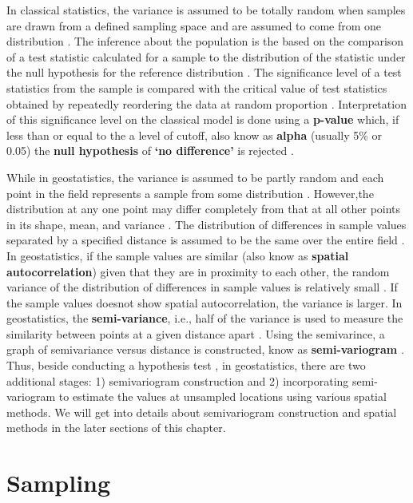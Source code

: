 \documentclass[
]{book}
\begin{document}
In classical statistics, the variance is assumed to be totally random when samples are drawn from a defined sampling space \citep{jacquez_spatial_1999} and are assumed to come from one distribution \citep{steel_principles_1980}. The inference about the population is the based on the comparison of a test statistic calculated for a sample to the distribution of the statistic under the null hypothesis for the reference distribution \citep{jacquez_spatial_1999}. The significance level of a test statistics from the sample is compared with the critical value of test statistics obtained by repeatedly reordering the data at random proportion \citep{jacquez_spatial_1999}. Interpretation of this significance level on the classical model is done using a \textbf{p-value} which, if less than or equal to the a level of cutoff, also know as \textbf{alpha} (usually 5\% or 0.05) the \textbf{null hypothesis} of \textbf{`no difference'} is rejected \citep{jacquez_spatial_1999}.

While in geostatistics, the variance is assumed to be partly random and each point in the field represents a sample from some distribution \citep{jacquez_spatial_1999}. However,the distribution at any one point may differ completely from that at all other points in its shape, mean, and variance \citep{jacquez_spatial_1999}. The distribution of differences in sample values separated by a specified distance is assumed to be the same over the entire field \citep{jacquez_spatial_1999}. In geostatistics, if the sample values are similar (also know as \textbf{spatial autocorrelation}) given that they are in proximity to each other, the random variance of the distribution of differences in sample values is relatively small \citep{jacquez_spatial_1999}. If the sample values doesnot show spatial autocorrelation, the variance is larger. In geostatistics, the \textbf{semi-variance}, i.e., half of the variance is used to measure the similarity between points at a given distance apart \citep{jacquez_spatial_1999}. Using the semivarince, a graph of semivariance versus distance is constructed, know as \textbf{semi-variogram} \citep{jacquez_spatial_1999}. Thus, beside conducting a hypothesis test , in geostatistics, there are two additional stages: 1) semivariogram construction and 2) incorporating semi-variogram to estimate the values at unsampled locations using various spatial methods. We will get into details about semivariogram construction and spatial methods in the later sections of this chapter.

\hypertarget{sampling-1}{%
\section{Sampling}\label{sampling-1}}
\end{document}
